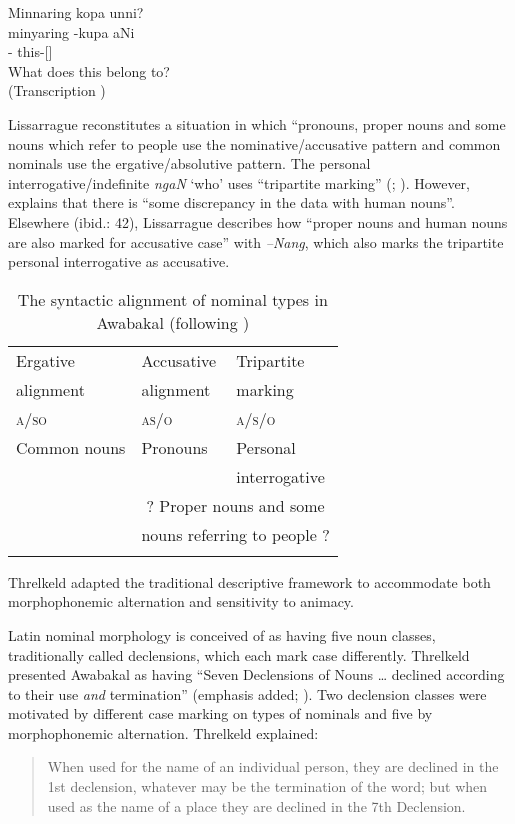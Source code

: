 \ea\label{ex:3:3-22}
\glll Minnaring kopa	 unni?  \\
minyaring -kupa 	 aNi  \\
-	 this-[] \\
\glt What does this belong to? \\
(Transcription \citealt[51]{lissarrague_salvage_2006})
\z

Lissarrague reconstitutes a situation in which “pronouns, proper nouns and some nouns which refer to people use the nominative/accusative pattern and common nominals use the ergative/absolutive pattern. The personal interrogative/indefinite \textit{ngaN} `who' uses ``tripartite marking'' (\citealt[26]{lissarrague_salvage_2006}; ). However, \citet[39]{lissarrague_salvage_2006} explains that there is “some discrepancy in the data with human nouns”. Elsewhere (ibid.: 42), Lissarrague describes how “proper nouns and human nouns are also marked for accusative case” with \textit{–Nang}, which also marks the tripartite personal interrogative as accusative.

\begin{table}
	\centering
	\begin{tabular}{lll}
		\lsptoprule
		Ergative & Accusative & Tripartite  \\
		alignment & alignment & marking \\
		\textsc{a/so} & \textsc{as/o}  & \textsc{a/s/o} \\
		\midrule
		Common nouns & Pronouns & Personal \\
									 & 					 & interrogative \\
									 & \multicolumn{2}{c}{? Proper nouns and some} \\
									 & \multicolumn{2}{c}{nouns referring to people ?}  \\
		\lspbottomrule
	\end{tabular}
	\caption{The syntactic alignment of nominal types in Awabakal (following \citealt[26]{lissarrague_salvage_2006})}
	\label{tab:3:42}
\end{table}


Threlkeld adapted the traditional descriptive framework to accommodate both morphophonemic alternation and sensitivity to animacy. 

Latin nominal morphology is conceived of as having five noun classes, traditionally called declensions, which each mark case differently. Threlkeld presented Awabakal as having “Seven Declensions of Nouns … declined according to their use \textit{and} termination” (emphasis added; \citeyear[10]{threlkeld_australian_1834}). Two declension classes were motivated by different case marking on types of nominals and five by morphophonemic alternation. Threlkeld explained: 
\begin{quote}
    When used for the name of an individual person, they are declined in the 1st declension, whatever may be the termination of the word; but when used as the name of a place they are declined in the 7th Declension. \citep[10]{threlkeld_australian_1834}
\end{quote}

